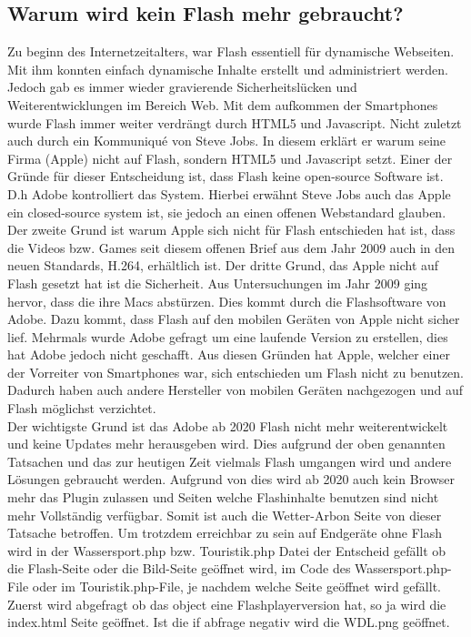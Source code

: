 \documentclass[a4paper,ngerman, 11pt, pagesize]{report}
\begin{document}
\subsection{Warum wird kein Flash mehr gebraucht?}
Zu beginn des Internetzeitalters, war Flash essentiell für dynamische Webseiten. Mit ihm konnten einfach dynamische Inhalte erstellt und administriert werden. Jedoch gab es immer wieder gravierende Sicherheitslücken und Weiterentwicklungen im Bereich Web. Mit dem aufkommen der Smartphones wurde Flash immer weiter verdrängt durch HTML5 und Javascript. Nicht zuletzt auch durch ein Kommuniqué von Steve Jobs. In diesem erklärt er warum seine Firma (Apple) nicht auf Flash, sondern HTML5 und Javascript setzt. Einer der Gründe für dieser Entscheidung ist, dass Flash keine open-source Software ist. D.h Adobe kontrolliert das System. Hierbei erwähnt Steve Jobs auch das Apple ein closed-source system ist, sie jedoch an einen offenen Webstandard glauben. Der zweite Grund ist warum Apple sich nicht für Flash entschieden hat ist, dass die Videos bzw. Games seit diesem offenen Brief aus dem Jahr 2009 auch in den neuen Standards, H.264, erhältlich ist. Der dritte Grund, das Apple nicht auf Flash gesetzt hat ist die Sicherheit. Aus Untersuchungen im Jahr 2009 ging hervor, dass die ihre Macs abstürzen. Dies kommt durch die Flashsoftware von Adobe. Dazu kommt, dass Flash auf den mobilen Geräten von Apple nicht sicher lief. Mehrmals wurde Adobe gefragt um eine laufende Version zu erstellen, dies hat Adobe jedoch nicht geschafft. Aus diesen Gründen hat Apple, welcher einer der Vorreiter von Smartphones war, sich entschieden um Flash nicht zu benutzen. Dadurch haben auch andere Hersteller von mobilen Geräten nachgezogen und auf Flash möglichst verzichtet. \cite{Apple:ThoughtsOnFlash} \\
Der wichtigste Grund ist das Adobe ab 2020 Flash nicht mehr weiterentwickelt und keine Updates mehr herausgeben wird. Dies aufgrund der oben genannten Tatsachen und das zur heutigen Zeit vielmals Flash umgangen wird und andere Lösungen gebraucht werden. Aufgrund von dies wird ab 2020 auch kein Browser mehr das Plugin zulassen und Seiten welche Flashinhalte benutzen sind nicht mehr Vollständig verfügbar. Somit ist auch die Wetter-Arbon Seite von dieser Tatsache betroffen. Um trotzdem erreichbar zu sein auf Endgeräte ohne Flash wird in der Wassersport.php bzw. Touristik.php Datei der Entscheid gefällt ob die Flash-Seite oder die Bild-Seite geöffnet wird, im Code des Wassersport.php-File oder im Touristik.php-File, je nachdem welche Seite geöffnet wird gefällt. Zuerst wird abgefragt ob das object eine Flashplayerversion hat, so ja wird die index.html Seite geöffnet. Ist die if abfrage negativ wird die WDL.png geöffnet. \cite{Adobe:FlashTheFutureofInteractiveContent}
\end{document}
